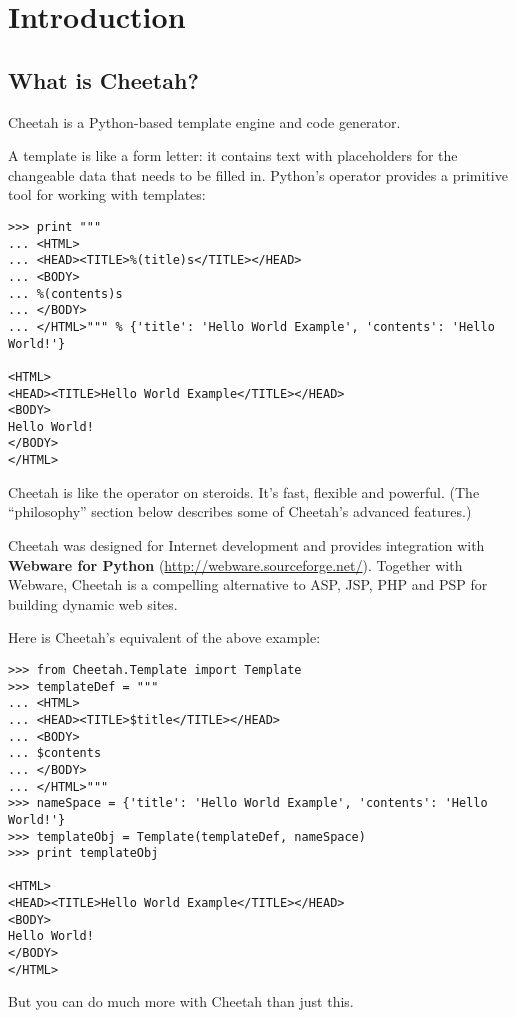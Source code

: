 \section{Introduction}
\label{intro}

\subsection{What is Cheetah?}
\label{intro.whatIs}

Cheetah is a Python-based template engine and code generator.  

A template is like a form letter: it contains text with placeholders for the
changeable data that needs to be filled in.  Python's \code{\%} operator
provides a primitive tool for working with templates:

\begin{verbatim}
>>> print """
... <HTML>
... <HEAD><TITLE>%(title)s</TITLE></HEAD>
... <BODY>
... %(contents)s
... </BODY>
... </HTML>""" % {'title': 'Hello World Example', 'contents': 'Hello World!'}

<HTML>
<HEAD><TITLE>Hello World Example</TITLE></HEAD>
<BODY>
Hello World!
</BODY>
</HTML>
\end{verbatim}

Cheetah is like the \code{\%} operator on steroids.  It's fast, flexible and
powerful.  (The ``philosophy'' section below describes some of Cheetah's
advanced features.) 

Cheetah was designed for Internet development and provides integration with
{\bf Webware for Python} (\url{http://webware.sourceforge.net/}).  Together
with Webware, Cheetah is a compelling alternative to ASP, JSP, PHP and PSP for
building dynamic web sites.

Here is Cheetah's equivalent of the above example:

\begin{verbatim}
>>> from Cheetah.Template import Template
>>> templateDef = """
... <HTML>
... <HEAD><TITLE>$title</TITLE></HEAD>
... <BODY>
... $contents
... </BODY>
... </HTML>"""
>>> nameSpace = {'title': 'Hello World Example', 'contents': 'Hello World!'}
>>> templateObj = Template(templateDef, nameSpace)
>>> print templateObj
 
<HTML>
<HEAD><TITLE>Hello World Example</TITLE></HEAD>
<BODY>
Hello World!
</BODY>
</HTML>
\end{verbatim}


But you can do much more with Cheetah than just this.



